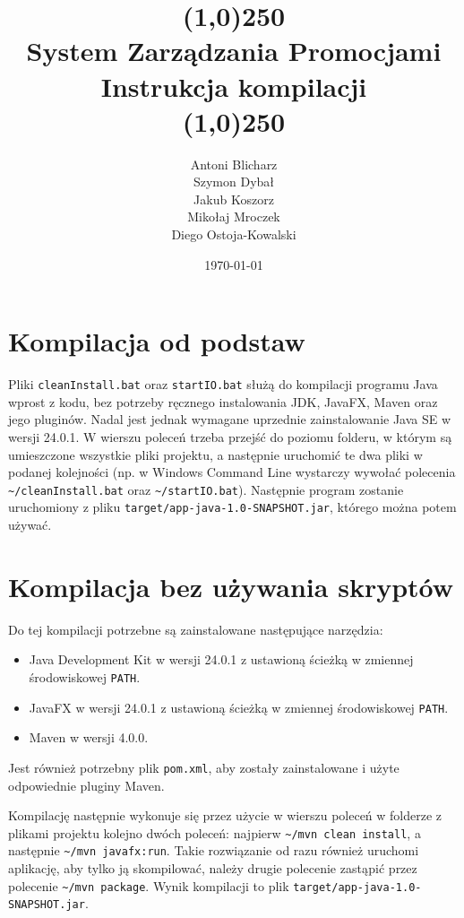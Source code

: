\documentclass[a4paper,12pt]{article}
\title{
    \line(1,0){250}\\
    System Zarządzania Promocjami\\
    Instrukcja kompilacji\\
    \line(1,0){250}}
\author{Antoni Blicharz\\
        Szymon Dybał\\
        Jakub Koszorz\\
        Mikołaj Mroczek\\
        Diego Ostoja-Kowalski\\}
\date{\today}
\begin{document}
\begin{titlepage}
    \maketitle
\end{titlepage}

\newpage

\section{Kompilacja od podstaw}

Pliki \texttt{cleanInstall.bat} oraz \texttt{startIO.bat} służą do kompilacji programu Java wprost z kodu, bez potrzeby ręcznego instalowania JDK, JavaFX, Maven oraz jego pluginów.
Nadal jest jednak wymagane uprzednie zainstalowanie Java SE w wersji 24.0.1.
W wierszu poleceń trzeba przejść do poziomu folderu, w którym są umieszczone wszystkie pliki projektu, a następnie uruchomić te dwa pliki w podanej kolejności (np. w Windows Command Line wystarczy wywołać polecenia \texttt{\~{}/cleanInstall.bat} oraz \texttt{\~{}/startIO.bat}).
Następnie program zostanie uruchomiony z pliku \texttt{target/app-java-1.0-SNAPSHOT.jar}, którego można potem używać.

\section{Kompilacja bez używania skryptów}

Do tej kompilacji potrzebne są zainstalowane następujące narzędzia:
\begin{itemize}
    \item Java Development Kit w wersji 24.0.1 z ustawioną ścieżką w zmiennej środowiskowej \texttt{PATH}.
    \item JavaFX w wersji 24.0.1 z ustawioną ścieżką w zmiennej środowiskowej \texttt{PATH}.
    \item Maven w wersji 4.0.0.
\end{itemize}
Jest również potrzebny plik \texttt{pom.xml}, aby zostały zainstalowane i użyte odpowiednie pluginy Maven.

Kompilację następnie wykonuje się przez użycie w wierszu poleceń w folderze z plikami projektu kolejno dwóch poleceń: najpierw \texttt{\~{}/mvn clean install}, a następnie \texttt{\~{}/mvn javafx:run}.
Takie rozwiązanie od razu również uruchomi aplikację, aby tylko ją skompilować, należy drugie polecenie zastąpić przez polecenie \texttt{\~{}/mvn package}.
Wynik kompilacji to plik \texttt{target/app-java-1.0-SNAPSHOT.jar}.
\end{document}

